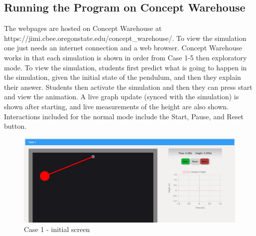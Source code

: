     
    
    
\subsection{Running the Program on Concept Warehouse}
The webpages are hosted on Concept Warehouse at https://jimi.cbee.oregonstate.edu/concept\_warehouse/. To view the simulation one just needs an internet connection and a web browser. 
Concept Warehouse works in that each simulation is shown in order from Case 1-5 then exploratory mode. To view the simulation, students first predict what is going to happen in the simulation, given the initial state of the pendulum, and then they explain their answer. Students then activate the simulation and then they can press start and view the animation. A live graph update (synced with the simulation) is shown after starting, and live measurements of the height are also shown. Interactions included for the normal mode include the Start, Pause, and Reset button. 
\begin{figure}[H]
  \includegraphics[width=5.5 in]{sim_pics/case1_start.png}
  \caption{Case 1 - initial screen }
  \label{fig:case1_end}
\end{figure}

